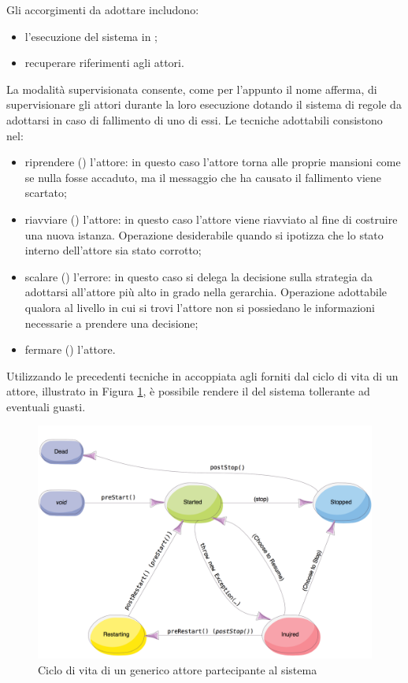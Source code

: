 Gli accorgimenti da adottare includono:

\begin{itemize}
\item{l'esecuzione del sistema in ;}
\item{recuperare riferimenti agli attori.}
\end{itemize}

La modalità supervisionata consente, come per l'appunto il nome afferma, di supervisionare gli attori durante la loro esecuzione dotando il sistema di regole da adottarsi in caso di fallimento di uno di essi. Le tecniche adottabili consistono nel:

\begin{itemize}
\item{riprendere () l'attore: in questo caso l'attore torna alle proprie mansioni come se nulla fosse accaduto, ma il messaggio che ha causato il fallimento viene scartato;}
\item{riavviare () l'attore: in questo caso l'attore viene riavviato al fine di costruire una nuova istanza. Operazione desiderabile quando si ipotizza che lo stato interno dell'attore sia stato corrotto;}
\item{scalare () l'errore: in questo caso si delega la decisione sulla strategia da adottarsi all'attore più alto in grado nella gerarchia. Operazione adottabile qualora al livello in cui si trovi l'attore non si possiedano le informazioni necessarie a prendere una decisione;}
\item{fermare () l'attore.}
\end{itemize}

Utilizzando le precedenti tecniche in accoppiata agli  forniti dal ciclo di vita di un attore, illustrato in Figura \ref{analisi-del-problema-distribuzione-recupero-da-fallimento-ciclo-di-vita}, è possibile rendere il  del sistema tollerante ad eventuali guasti.

\begin{figure}
\centering
\includegraphics[scale=0.4]{images/analysis/Actor-lifecycle.png}
\caption{Ciclo di vita di un generico attore partecipante al sistema}
\label{analisi-del-problema-distribuzione-recupero-da-fallimento-ciclo-di-vita}
\end{figure}

